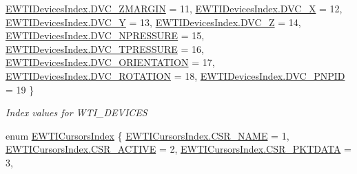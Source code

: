 \begin{DoxyCompactItemize}
\mbox{\hyperlink{namespace_wintab_d_n_a87e63128e31d86cb418e895f3d58565cae13690a5ec66f2d2af12eaeaf7dd913d}{E\+W\+T\+I\+Devices\+Index.\+D\+V\+C\+\_\+\+Z\+M\+A\+R\+G\+IN}} = 11, 
\mbox{\hyperlink{namespace_wintab_d_n_a87e63128e31d86cb418e895f3d58565ca1caaaea5b0b04abfeb80d0aa163e40d0}{E\+W\+T\+I\+Devices\+Index.\+D\+V\+C\+\_\+X}} = 12, 
\newline
\mbox{\hyperlink{namespace_wintab_d_n_a87e63128e31d86cb418e895f3d58565ca07cd6a2a411f159d26c92dee033634cf}{E\+W\+T\+I\+Devices\+Index.\+D\+V\+C\+\_\+Y}} = 13, 
\mbox{\hyperlink{namespace_wintab_d_n_a87e63128e31d86cb418e895f3d58565ca72feabe514e5dfa4edd58fe2a8863933}{E\+W\+T\+I\+Devices\+Index.\+D\+V\+C\+\_\+Z}} = 14, 
\mbox{\hyperlink{namespace_wintab_d_n_a87e63128e31d86cb418e895f3d58565cad5006bddd567193470908da64091a74c}{E\+W\+T\+I\+Devices\+Index.\+D\+V\+C\+\_\+\+N\+P\+R\+E\+S\+S\+U\+RE}} = 15, 
\mbox{\hyperlink{namespace_wintab_d_n_a87e63128e31d86cb418e895f3d58565ca84b3d724b9969e4e11e3d2a7e24e1da2}{E\+W\+T\+I\+Devices\+Index.\+D\+V\+C\+\_\+\+T\+P\+R\+E\+S\+S\+U\+RE}} = 16, 
\newline
\mbox{\hyperlink{namespace_wintab_d_n_a87e63128e31d86cb418e895f3d58565caf7a01674933b87c80bfd6abb427ccad4}{E\+W\+T\+I\+Devices\+Index.\+D\+V\+C\+\_\+\+O\+R\+I\+E\+N\+T\+A\+T\+I\+ON}} = 17, 
\mbox{\hyperlink{namespace_wintab_d_n_a87e63128e31d86cb418e895f3d58565caf41cd5dd7f23faa0c29759287bd48d31}{E\+W\+T\+I\+Devices\+Index.\+D\+V\+C\+\_\+\+R\+O\+T\+A\+T\+I\+ON}} = 18, 
\mbox{\hyperlink{namespace_wintab_d_n_a87e63128e31d86cb418e895f3d58565ca64d03ad2498f400198da58816caa9995}{E\+W\+T\+I\+Devices\+Index.\+D\+V\+C\+\_\+\+P\+N\+P\+ID}} = 19
 \}
\begin{DoxyCompactList}\small\item\em Index values for W\+T\+I\+\_\+\+D\+E\+V\+I\+C\+ES \end{DoxyCompactList}\item 
enum \mbox{\hyperlink{namespace_wintab_d_n_a215ef64798be3e0207e5bbf438659d61}{E\+W\+T\+I\+Cursors\+Index}} \{ \newline
\mbox{\hyperlink{namespace_wintab_d_n_a215ef64798be3e0207e5bbf438659d61a3bd7c2b56898962a7309dda568b328b8}{E\+W\+T\+I\+Cursors\+Index.\+C\+S\+R\+\_\+\+N\+A\+ME}} = 1, 
\mbox{\hyperlink{namespace_wintab_d_n_a215ef64798be3e0207e5bbf438659d61a2a360558d93a67ef0b2f03792c1f037c}{E\+W\+T\+I\+Cursors\+Index.\+C\+S\+R\+\_\+\+A\+C\+T\+I\+VE}} = 2, 
\mbox{\hyperlink{namespace_wintab_d_n_a215ef64798be3e0207e5bbf438659d61acd1b188aeaa6c3ab7f4c175172bc758e}{E\+W\+T\+I\+Cursors\+Index.\+C\+S\+R\+\_\+\+P\+K\+T\+D\+A\+TA}} = 3, 

\end{DoxyCompactItemize}
